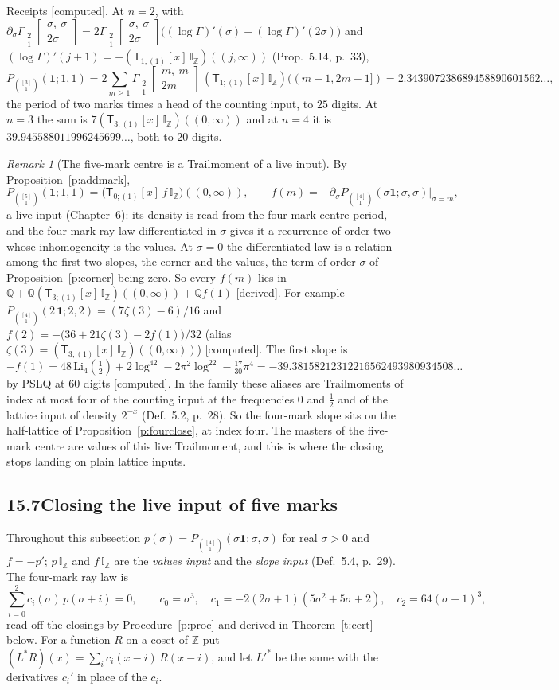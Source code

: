 \documentclass[11pt]{article}
\newcommand{\one}{\mathbf 1}
\newcommand{\sT}{\mathsf T}
\newcommand{\Gst}[4]{\Gamma_{\substack{#1\\#2}}\!\begin{bmatrix}#3\\#4\end{bmatrix}}
\newcommand{\IZ}{\mathbb I_{\mathbb Z}}
\newcommand{\Tx}[3]{(\sT_{#1;(1)}[x]\,#2)((#3,\infty))}
\theoremstyle{plain}
\theoremstyle{definition}
\theoremstyle{remark}
\newtheorem{remark}[proposition]{Remark}
\newcommand{\derived}{\textup{[derived]}}
\newcommand{\computed}{\textup{[computed]}}
\begin{document}
\noindent Receipts \computed. At $n=2$, with $\partial_\sigma\Gst21{\sigma,\ \sigma}{2\sigma}=2\Gst21{\sigma,\ \sigma}{2\sigma}\big((\log\Gamma)'(\sigma)-(\log\Gamma)'(2\sigma)\big)$ and $(\log\Gamma)'(j+1)=-\Tx{1}{\IZ}{j}$ (Prop.~5.14, p.~33),
\[
P_{\binom{[3]}1}(\one;1,1)=2\sum_{m\ge1}\Gst21{m,\ m}{2m}\,(\sT_{1;(1)}[x]\,\IZ)((m-1,2m-1])=2.343907238689458890601562\ldots,
\]
the period of two marks times a head of the counting input, to $25$ digits. At $n=3$ the sum is $7\Tx{3}{\IZ}{0}$ and at $n=4$ it is $39.945588011996245699\ldots$, both to $20$ digits.

\begin{remark}[The five-mark centre is a Trailmoment of a live input]\label{r:live}
By Proposition~\ref{p:addmark},
\[
P_{\binom{[5]}1}(\one;1,1)=\big(\sT_{0;(1)}[x]\,f\,\IZ\big)((0,\infty)),\qquad f(m)=-\partial_\sigma P_{\binom{[4]}1}(\sigma\one;\sigma,\sigma)\big|_{\sigma=m},
\]
a live input (Chapter~6): its density is read from the four-mark centre period, and the four-mark ray law differentiated in $\sigma$ gives it a recurrence of order two whose inhomogeneity is the values. At $\sigma=0$ the differentiated law is a relation among the first two slopes, the corner and the values, the term of order $\sigma$ of Proposition~\ref{p:corner} being zero. So every $f(m)$ lies in $\mathbb Q+\mathbb Q\Tx{3}{\IZ}{0}+\mathbb Q f(1)$ \derived. For example $P_{\binom{[4]}1}(2\,\one;2,2)=(7\zeta(3)-6)/16$ and $f(2)=-\big(36+21\zeta(3)-2f(1)\big)/32$ (alias $\zeta(3)=\Tx{3}{\IZ}{0}$) \computed. The first slope is
\[
-f(1)=48\,\mathrm{Li}_4(\tfrac12)+2\log^42-2\pi^2\log^22-\tfrac{17}{30}\pi^4=-39.38158212312216562493980934508\ldots
\]
by PSLQ at $60$ digits \computed. In the family these aliases are Trailmoments of index at most four of the counting input at the frequencies $0$ and $\frac12$ and of the lattice input of density $2^{-x}$ (Def.~5.2, p.~28). So the four-mark slope sits on the half-lattice of Proposition~\ref{p:fourclose}, at index four. The masters of the five-mark centre are values of this live Trailmoment, and this is where the closing stops landing on plain lattice inputs.
\end{remark}

\subsection*{15.7\quad Closing the live input of five marks}

Throughout this subsection $p(\sigma)=P_{\binom{[4]}1}(\sigma\one;\sigma,\sigma)$ for real $\sigma>0$ and $f=-p'$; $p\,\IZ$ and $f\,\IZ$ are the \emph{values input} and the \emph{slope input} (Def.~5.4, p.~29). The four-mark ray law is
\[
\sum_{i=0}^2c_i(\sigma)\,p(\sigma+i)=0,\qquad c_0=\sigma^3,\quad c_1=-2(2\sigma+1)(5\sigma^2+5\sigma+2),\quad c_2=64(\sigma+1)^3,
\]
read off the closings by Procedure~\ref{p:proc} and derived in Theorem~\ref{t:cert} below. For a function $R$ on a coset of $\mathbb Z$ put $(L^\ast R)(x)=\sum_ic_i(x-i)\,R(x-i)$, and let $L'^\ast$ be the same with the derivatives $c_i'$ in place of the $c_i$.
\end{document}

